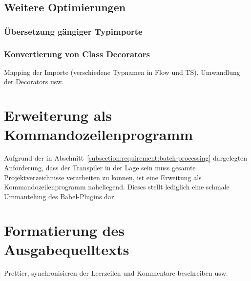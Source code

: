   \subsection{Weitere Optimierungen}
    \subsubsection{Übersetzung gängiger Typimporte}
    \subsubsection{Konvertierung von Class Decorators}

  Mapping der Importe (verschiedene Typnamen in Flow und TS), Umwandlung der Decorators usw.

\section{Erweiterung als Kommandozeilenprogramm}

Aufgrund der in Abschnitt~\ref{subsection:requirement:batch-processing} dargelegten Anforderung, dass der Transpiler in der Lage sein muss gesamte Projektverzeichnisse  verarbeiten zu können, ist eine Erweitung als Kommandozeilenprogramm naheliegend.
Dieses stellt lediglich eine schmale Ummantelung des Babel-Plugins dar



\section{Formatierung des Ausgabequelltexts}

  Prettier, synchronisieren der Leerzeilen und Kommentare beschreiben usw.

